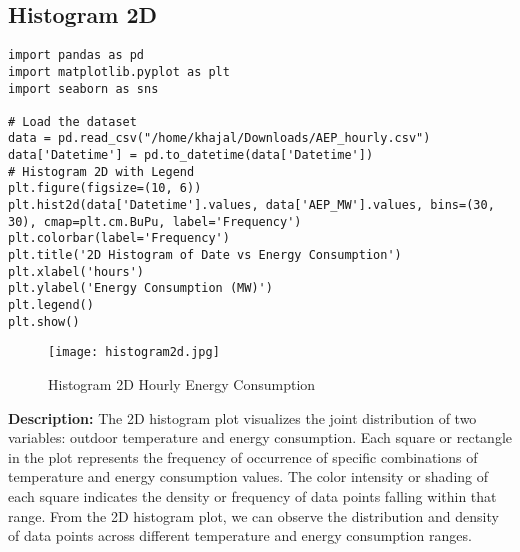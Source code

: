 \documentclass{article}
\begin{document}
\subsection{Histogram 2D}
\begin{lstlisting}[caption={Python code for 2D Histogram}]
import pandas as pd
import matplotlib.pyplot as plt
import seaborn as sns

# Load the dataset
data = pd.read_csv("/home/khajal/Downloads/AEP_hourly.csv")
data['Datetime'] = pd.to_datetime(data['Datetime'])
# Histogram 2D with Legend
plt.figure(figsize=(10, 6))
plt.hist2d(data['Datetime'].values, data['AEP_MW'].values, bins=(30, 30), cmap=plt.cm.BuPu, label='Frequency')
plt.colorbar(label='Frequency')
plt.title('2D Histogram of Date vs Energy Consumption')
plt.xlabel('hours')
plt.ylabel('Energy Consumption (MW)')
plt.legend()
plt.show()
\end{lstlisting}
\begin{figure}[H]
    \centering
    \texttt{[image: histogram2d.jpg]}
    \caption{Histogram 2D Hourly Energy Consumption}
    \label{fig:Histogram2D}
\end{figure}
\textbf{Description:}
The 2D histogram plot visualizes the joint distribution of two variables: outdoor temperature and energy consumption. Each square or rectangle in the plot represents the frequency of occurrence of specific combinations of temperature and energy consumption values. The color intensity or shading of each square indicates the density or frequency of data points falling within that range.
From the 2D histogram plot, we can observe the distribution and density of data points across different temperature and energy consumption ranges.
\end{document}
